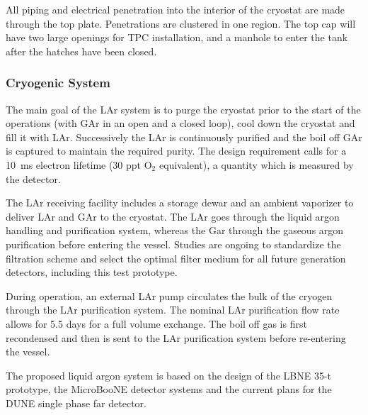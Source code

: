 All piping and electrical penetration into the interior of the
cryostat are made through the top plate.  Penetrations are clustered
in one region.  The top cap will have two large openings for TPC
installation, and a manhole to enter the tank after the hatches have
been closed.

\subsubsection{Cryogenic System}

The main goal of the LAr system is to purge the cryostat prior to the
start of the operations (with GAr in an open and a closed loop), cool
down the cryostat and fill it with LAr. Successively the LAr is
continuously purified and the boil off GAr is captured to maintain the
required purity. The design requirement calls for a 10~ms electron
lifetime (30 ppt O$_2$ equivalent), a quantity which is measured by
the detector.

The LAr receiving facility includes a storage dewar and an ambient
vaporizer to deliver LAr and GAr to the cryostat. The LAr goes through
the liquid argon handling and purification system, whereas the Gar
through the gaseous argon purification before entering the vessel.
Studies are ongoing to standardize the filtration scheme and select
the optimal filter medium for all future generation detectors,
including this test prototype.

During operation, an external LAr pump circulates the bulk of the
cryogen through the LAr purification system. The nominal LAr
purification flow rate allows for 5.5 days for a full volume exchange.
The boil off gas is first recondensed and then is sent to the LAr
purification system before re-entering the vessel.

The proposed liquid argon system is based on the design of the LBNE
35-t prototype, the MicroBooNE detector systems and the current plans
for the DUNE single phase far detector.








    
    
